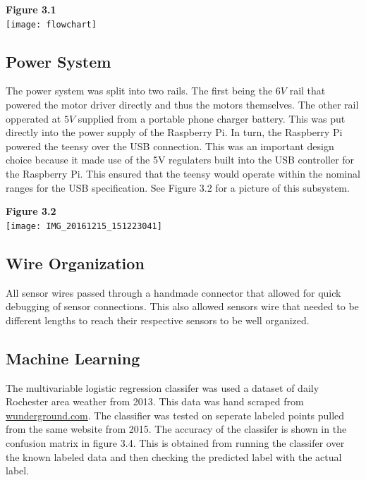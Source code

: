 \documentclass[UTF8]{article}
\begin{document}
\begin{center}
\textbf{Figure 3.1} \\
\texttt{[image: flowchart]}
\end{center}

\subsection{Power System}
The power system was split into two rails. The first being the $6V$ rail that powered the motor driver directly and thus the motors themselves. The other rail opperated at $5V$ supplied from a portable phone charger battery. This was put directly into the power supply of the Raspberry Pi. In turn, the Raspberry Pi powered the teensy over the USB connection. This was an important design choice because it made use of the 5V regulaters built into the USB controller for the Raspberry Pi. This ensured that the teensy would operate within the nominal ranges for the USB specification. See Figure 3.2 for a picture of this subsystem.
\begin{center}
\vspace{3mm}
\textbf{Figure 3.2}\\
\texttt{[image: IMG\_20161215\_151223041]} \\
\end{center}

\subsection{Wire Organization}
All sensor wires passed through a handmade connector that allowed for quick debugging of sensor connections. This also allowed sensors wire that needed to be different lengths to reach their respective sensors to be well organized.

\subsection{Machine Learning}
The multivariable logistic regression classifer was used a dataset of daily Rochester area weather from 2013. This data was hand scraped from \href{https://www.wunderground.com/}{wunderground.com}. The classifier was tested on seperate labeled points pulled from the same website from 2015. The accuracy of the classifer is shown in the confusion matrix in figure 3.4. This is obtained from running the classifer over the known labeled data and then checking the predicted label with the actual label.
\end{document}
